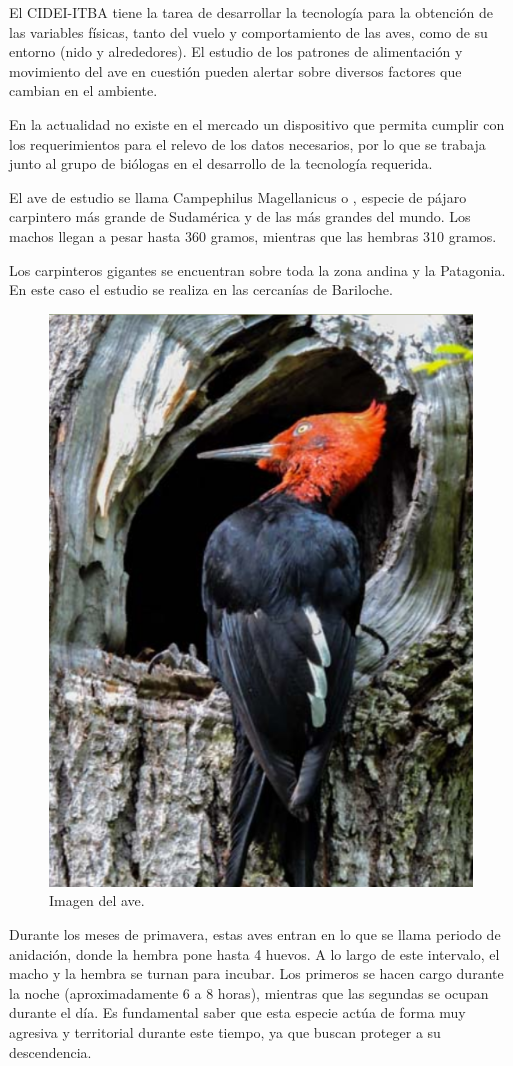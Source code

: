 El CIDEI-ITBA tiene la tarea de desarrollar la tecnología para la obtención de las variables físicas, tanto del vuelo y comportamiento de las aves, como de su entorno (nido y alrededores). El estudio de los patrones de alimentación y movimiento del ave en cuestión pueden alertar sobre diversos factores que cambian en el ambiente.

En la actualidad no existe en el mercado un dispositivo que permita cumplir con los requerimientos para el relevo de los datos necesarios, por lo que se trabaja junto al grupo de biólogas en el desarrollo de la tecnología requerida.

El ave de estudio se llama Campephilus Magellanicus o , especie de pájaro carpintero más grande de Sudamérica y de las más grandes del mundo. Los machos llegan a pesar hasta 360 gramos, mientras que las hembras 310 gramos.

Los carpinteros gigantes se encuentran sobre toda la zona andina y la Patagonia. En este caso el estudio se realiza en las cercanías de Bariloche. 
\begin{figure}[H]
	\centering
	\includegraphics[width=0.4\linewidth]{ImagenesIntroduccion/pajaro}
	\caption{Imagen del ave.}
	\label{fig:pajaro}
\end{figure}

Durante los meses de primavera, estas aves entran en lo que se llama periodo de anidación, donde la hembra pone hasta 4 huevos. A lo largo de este intervalo, el macho y la hembra se turnan para incubar. Los primeros se hacen cargo durante la noche (aproximadamente 6 a 8 horas), mientras que las segundas se ocupan durante el día. Es fundamental saber que esta especie actúa de forma muy agresiva y territorial durante este tiempo, ya que buscan proteger a su descendencia.

